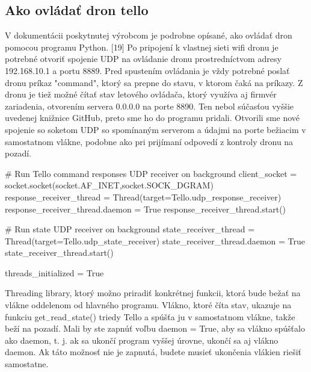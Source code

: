 \subsection{Ako ovládať dron tello}
V dokumentácii poskytnutej výrobcom je podrobne opísané, ako ovládať dron pomocou programu Python. [19] Po pripojení k vlastnej sieti wifi dronu je potrebné otvoriť spojenie UDP na ovládanie dronu prostredníctvom adresy 192.168.10.1 a portu 8889. Pred spustením ovládania je vždy potrebné poslať dronu príkaz "command", ktorý sa prepne do stavu, v ktorom čaká na príkazy. 
Z dronu je tiež možné čítať stav letového ovládača, ktorý využíva aj firmvér zariadenia, otvorením servera 0.0.0.0 na porte 8890. Ten nebol súčasťou vyššie uvedenej knižnice GitHub, preto sme ho do programu pridali. Otvorili sme nové spojenie so soketom UDP so spomínaným serverom a údajmi na porte bežiacim v samostatnom vlákne, podobne ako pri prijímaní odpovedí z kontroly dronu na pozadí. 

\begin{mypython}[caption={Úryvok kódu 1 ukazuje obsluhu vlákna obsiahnutú v jazyku Python },label=SO-test]
    # Run Tello command responses UDP receiver on background
    client_socket = socket.socket(socket.AF_INET,socket.SOCK_DGRAM)
    response_receiver_thread = Thread(target=Tello.udp_response_receiver)
    response_receiver_thread.daemon = True
    response_receiver_thread.start()

    # Run state UDP receiver on background
    state_receiver_thread = Thread(target=Tello.udp_state_receiver)
    state_receiver_thread.daemon = True
    state_receiver_thread.start()

    threads_initialized = True
\end{mypython} 

 

Threading library, ktorý možno priradiť konkrétnej funkcii, 
ktorá bude bežať na vlákne oddelenom od hlavného programu. 
Vlákno, ktoré číta stav, ukazuje na funkciu get$_-$read$_-$state()
triedy Tello a spúšťa ju v samostatnom vlákne, takže beží na pozadí. Mali by ste zapnúť voľbu daemon = True, aby sa 
vlákno spúšťalo ako daemon, t. j. ak sa ukončí program vyššej úrovne, ukončí sa aj vlákno daemon. Ak táto možnosť nie 
je zapnutá, budete musieť ukončenia vlákien riešiť samostatne.

